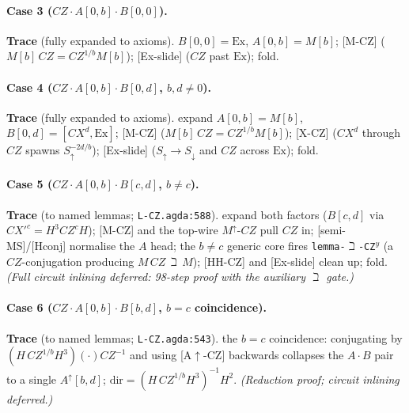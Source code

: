 \documentclass[a4paper]{article}
\newcommand{\lem}[1]{\textsf{[#1]}}      %
\begin{document}
\paragraph{Case 3 \;($CZ\cdot A[0,b]\cdot B[0,0]$).}
\begin{center}\end{center}
\textbf{Trace} (fully expanded to axioms). $B[0,0]=\mathrm{Ex}$, $A[0,b]=M[b]$; \lem{M-CZ} ($M[b]\,CZ=CZ^{1/b}M[b]$); \lem{Ex-slide} ($CZ$ past $\mathrm{Ex}$); fold.

\paragraph{Case 4 \;($CZ\cdot A[0,b]\cdot B[0,d]$, $b,d\neq0$).}
\begin{center}\end{center}
\textbf{Trace} (fully expanded to axioms). expand $A[0,b]=M[b]$, $B[0,d]=[CX^d,\mathrm{Ex}]$; \lem{M-CZ} ($M[b]\,CZ=CZ^{1/b}M[b]$); \lem{X-CZ} ($CX^d$ through $CZ$ spawns $S^{-2d/b}_\uparrow$); \lem{Ex-slide} ($S_\uparrow\!\to S_\downarrow$ and $CZ$ across $\mathrm{Ex}$); fold.

\paragraph{Case 5 \;($CZ\cdot A[0,b]\cdot B[c,d]$, $b\neq c$).}
\begin{center}\end{center}
\textbf{Trace} (to named lemmas; \texttt{L-CZ.agda:588}). expand both factors ($B[c,d]$ via $CX'^c=H^3CZ^cH$); \lem{M-CZ} and the top-wire $M^{\uparrow}\!$-$CZ$ pull $CZ$ in; \lem{semi-MS}/\lem{Hconj} normalise the $A$ head; the $b\neq c$ generic core fires \texttt{lemma-$\beth$-CZ$^y$} (a $CZ$-conjugation producing $M\,CZ\,\beth\,M$); \lem{HH-CZ} and \lem{Ex-slide} clean up; fold. \emph{(Full circuit inlining deferred: 98-step proof with the auxiliary $\beth$ gate.)}

\paragraph{Case 6 \;($CZ\cdot A[0,b]\cdot B[b,d]$, $b=c$ coincidence).}
\begin{center}\end{center}
\textbf{Trace} (to named lemmas; \texttt{L-CZ.agda:543}). the $b=c$ coincidence: conjugating by $(H\,CZ^{1/b}H^3)(\cdot)CZ^{-1}$ and using \lem{A$\uparrow$-CZ} backwards collapses the $A\cdot B$ pair to a single $A^{\uparrow}[b,d]$; $\mathrm{dir}=(H\,CZ^{1/b}H^3)^{-1}H^2$. \emph{(Reduction proof; circuit inlining deferred.)}
\end{document}
